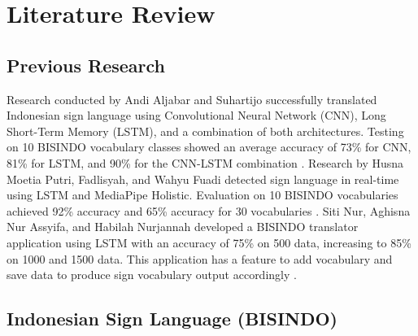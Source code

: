 


\section{Literature Review}
\label{sec:literaturereview}

\subsection{Previous Research}
\label{subsec:previousresearch}

Research conducted by Andi Aljabar and Suhartijo successfully translated Indonesian sign language using Convolutional Neural Network (CNN), Long Short-Term Memory (LSTM), and a combination of both architectures. Testing on 10 BISINDO vocabulary classes showed an average accuracy of 73\% for CNN, 81\% for LSTM, and 90\% for the CNN-LSTM combination \cite{aljabar2020}. Research by Husna Moetia Putri, Fadlisyah, and Wahyu Fuadi detected sign language in real-time using LSTM and MediaPipe Holistic. Evaluation on 10 BISINDO vocabularies achieved 92\% accuracy and 65\% accuracy for 30 vocabularies \cite{putri2022}. Siti Nur, Aghisna Nur Assyifa, and Habilah Nurjannah developed a BISINDO translator application using LSTM with an accuracy of 75\% on 500 data, increasing to 85\% on 1000 and 1500 data. This application has a feature to add vocabulary and save data to produce sign vocabulary output accordingly \cite{nur2023}.

\subsection{Indonesian Sign Language (BISINDO)}
\label{subsec:indonesiansignlanguage}

